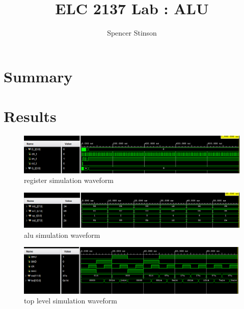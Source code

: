 \documentclass[11pt]{article}
\begin{document}
\title{ELC 2137 Lab : ALU}
\author{Spencer Stinson}

\maketitle


\section*{Summary}


\section*{Results}

\begin{figure}[ht]\centering
	\includegraphics[width= \textwidth ]{regsw.png}
	\caption{register simulation waveform}
	\label{fig: regsw}
\end{figure}

\begin{figure}[ht]\centering
	\includegraphics[width= \textwidth ]{alusw.png}
	\caption{alu simulation waveform}
	\label{fig: alusw}
\end{figure}

\begin{figure}[ht]\centering
	\includegraphics[width= \textwidth ]{swtls.png}
	\caption{top level simulation waveform}
	\label{fig: tlsw}
\end{figure}
\end{document}
